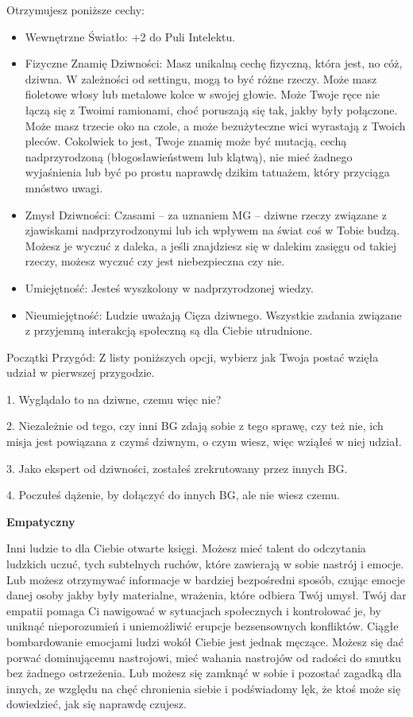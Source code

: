 Otrzymujesz poniższe cechy:
\begin{itemize}
\item Wewnętrzne Światło: +2 do Puli Intelektu.
\item Fizyczne Znamię Dziwności: Masz unikalną cechę fizyczną, która jest, no cóż, dziwna. W zależności od settingu, mogą to być różne rzeczy. Może masz fioletowe włosy lub metalowe kolce w swojej głowie. Może Twoje ręce nie łączą się z Twoimi ramionami, choć poruszają się tak, jakby były połączone. Może masz trzecie oko na czole, a może bezużyteczne wici wyrastają z Twoich pleców. Cokolwiek to jest, Twoje znamię może być mutacją, cechą nadprzyrodzoną (błogosławieństwem lub klątwą), nie mieć żadnego wyjaśnienia lub być po prostu naprawdę dzikim tatuażem, który przyciąga mnóstwo uwagi.
\item Zmysł Dziwności: Czasami – za uznaniem MG – dziwne rzeczy związane z zjawiskami nadprzyrodzonymi lub ich wpływem na świat coś w Tobie budzą. Możesz je wyczuć z daleka, a jeśli znajdziesz się w dalekim zasięgu od takiej rzeczy, możesz wyczuć czy jest niebezpieczna czy nie.
\item Umiejętność: Jesteś wyszkolony w nadprzyrodzonej wiedzy.
 \item Nieumiejętność: Ludzie uważają Cięza dziwnego. Wszystkie zadania związane z przyjemną interakcją społeczną są dla Ciebie utrudnione.
\end{itemize}
    
Początki Przygód: Z listy poniższych opcji, wybierz jak Twoja postać wzięła udział w pierwszej przygodzie.

1. Wyglądało to na dziwne, czemu więc nie?

2. Niezależnie od tego, czy inni BG zdają sobie z tego sprawę, czy też nie, ich misja jest powiązana z czymś dziwnym, o czym wiesz, więc wziąłeś w niej udział.

3. Jako ekspert od dziwności, zostałeś zrekrutowany przez innych BG.

4. Poczułeś dążenie, by dołączyć do innych BG, ale nie wiesz czemu.

\textbf{Empatyczny}

Inni ludzie to dla Ciebie otwarte księgi. Możesz mieć talent do odczytania ludzkich uczuć, tych subtelnych ruchów, które zawierają w sobie nastrój i emocje. Lub możesz otrzymywać informacje w bardziej bezpośredni sposób, czując emocje danej osoby jakby były materialne, wrażenia, które odbiera Twój umysł. Twój dar empatii pomaga Ci nawigować w sytuacjach społecznych i kontrolować je, by uniknąć nieporozumień i uniemożliwić erupcje bezsensownych konfliktów. 
Ciągłe bombardowanie emocjami ludzi wokół Ciebie jest jednak męczące. Możesz się dać porwać dominującemu nastrojowi, mieć wahania nastrojów od radości do smutku bez żadnego ostrzeżenia. Lub możesz się zamknąć w sobie i pozostać zagadką dla innych, ze względu na chęć chronienia siebie i podświadomy lęk, że ktoś może się dowiedzieć, jak się naprawdę czujesz.

